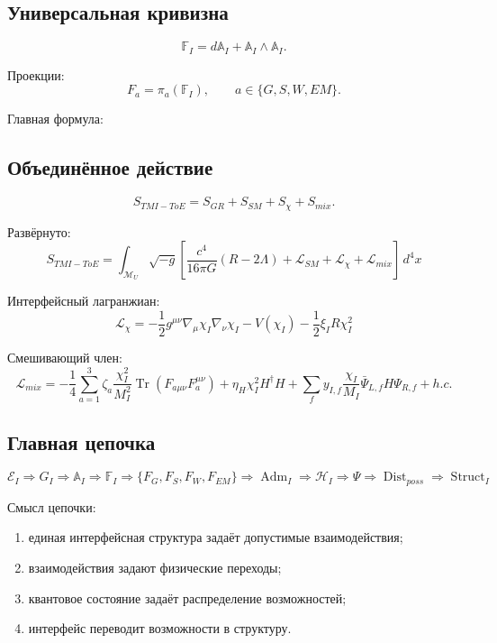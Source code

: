 \documentclass[12pt,a4paper]{article}
\DeclareMathOperator{\Tr}{Tr}
\newcommand{\Adm}{\operatorname{Adm}}
\newcommand{\Struct}{\operatorname{Struct}}
\newcommand{\Dist}{\operatorname{Dist}}
\newcommand{\dd}{\,d}
\begin{document}
\subsection{Универсальная кривизна}

\[
\boxed{\mathbb F_I=d\mathbb A_I+\mathbb A_I\wedge\mathbb A_I}.
\]

Проекции:
\[
\boxed{F_a=\pi_a(\mathbb F_I),\qquad a\in\{G,S,W,EM\}}.
\]

Главная формула:
\begin{center}
\end{center}

\subsection{Объединённое действие}

\[
\boxed{S_{TMI-ToE}=S_{GR}+S_{SM}+S_\chi+S_{mix}}.
\]

Развёрнуто:
\[
\boxed{
S_{TMI-ToE}=\int_{\mathcal M_U}\sqrt{-g}\left[
\frac{c^4}{16\pi G}(R-2\Lambda)+\mathcal L_{SM}+\mathcal L_\chi+\mathcal L_{mix}
\right]\dd^4x
}
\]

Интерфейсный лагранжиан:
\[
\boxed{
\mathcal L_\chi=
-\frac12g^{\mu\nu}\nabla_\mu\chi_I\nabla_\nu\chi_I
-V(\chi_I)-\frac12\xi_IR\chi_I^2
}
\]

Смешивающий член:
\[
\boxed{
\mathcal L_{mix}=
-\frac14\sum_{a=1}^{3}\zeta_a\frac{\chi_I^2}{M_I^2}\Tr(F_{a\mu\nu}F_a^{\mu\nu})
+\eta_H\chi_I^2H^\dagger H
+\sum_f y_{I,f}\frac{\chi_I}{M_I}\bar\Psi_{L,f}H\Psi_{R,f}+h.c.
}
\]

\subsection{Главная цепочка}

\[
\boxed{
\mathcal E_I\Rightarrow G_I\Rightarrow\mathbb A_I\Rightarrow\mathbb F_I\Rightarrow\{F_G,F_S,F_W,F_{EM}\}\Rightarrow\Adm_I\Rightarrow\mathcal H_I\Rightarrow\Psi\Rightarrow\Dist_{poss}\Rightarrow\Struct_I
}
\]

Смысл цепочки:
\begin{enumerate}
  \item единая интерфейсная структура задаёт допустимые взаимодействия;
  \item взаимодействия задают физические переходы;
  \item квантовое состояние задаёт распределение возможностей;
  \item интерфейс переводит возможности в структуру.
\end{enumerate}
\end{document}
